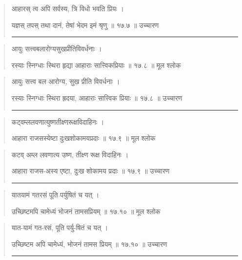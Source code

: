 \begin{quotation}

आहारस् त्व अपि सर्वस्य, त्रि विधो भवति प्रियः ।  

यज्ञस् तपस् तथा दानं, तेषां भेदम इमं श्रृणु  ॥ १७.७ ॥  उच्चारण

\noindent\rule{16cm}{0.4pt} 
\end{quotation}


\begin{quotation}

आयुः सत्त्वबलारोग्यसुखप्रीतिविवर्धनाः ।  

रस्याः स्निग्धाः स्थिरा हृद्या आहाराः सात्त्विकप्रियाः  ॥ १७.८ ॥  मूल श्लोक
\end{quotation}

\begin{quotation}

आयुः सत्त्व बल आरोग्य, सुख प्रीति विवर्धनाः ।  

रस्याः स्निग्धाः स्थिरा ह्रदया, आहाराः सात्त्विक प्रियाः  ॥ १७.८ ॥  उच्चारण

\noindent\rule{16cm}{0.4pt} 
\end{quotation}


\begin{quotation}

कट्वम्ललवणात्युष्णतीक्ष्णरूक्षविदाहिनः ।  

आहारा राजसस्येष्टा दुःखशोकामयप्रदाः  ॥ १७.९ ॥  मूल श्लोक
\end{quotation}

\begin{quotation}

कटव् अम्ल लवणात्य उष्ण, तीक्ष्ण रूक्ष विदाहिनः ।  

आहारा राजस-अस्य एष्टा, दुःख शोकामय प्रदाः  ॥ १७.९ ॥  उच्चारण

\noindent\rule{16cm}{0.4pt} 
\end{quotation}


\begin{quotation}

यातयामं गतरसं पूति पर्युषितं च यत्‌ ।  

उच्छिष्टमपि चामेध्यं भोजनं तामसप्रियम्‌  ॥ १७.१० ॥  मूल श्लोक
\end{quotation}

\begin{quotation}

यात-यामं गत-रसं, पूति पर्यु-षितं च यत्‌ ।  

उच्छिष्टम अपि चामेध्यं, भोजनं तामस प्रियम्‌  ॥ १७.१० ॥  उच्चारण

\noindent\rule{16cm}{0.4pt} 
\end{quotation}


